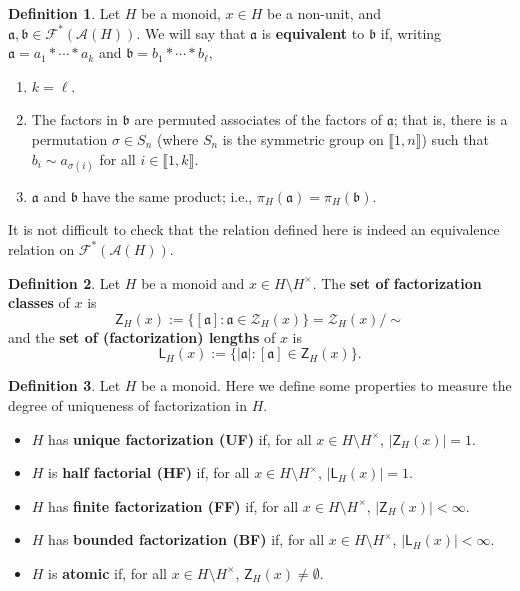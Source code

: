 \documentclass{report}
\newcommand{\A}{\mathscr{A}}
\renewcommand{\aa}{\mathfrak{a}}
\newcommand{\bb}{\mathfrak{b}}
\newcommand{\F}{\mathscr{F}}
\newcommand{\Z}{\mathcal{Z}}
\newcommand{\llb}{\llbracket}
\newcommand{\rrb}{\rrbracket}
\renewcommand{\:}{\text{:}}
\theoremstyle{definition}
\newtheorem{defn}{Definition}[section]
\begin{document}
\begin{defn}
Let $H$ be a monoid, $x\in H$ be a non-unit, and $\aa,\bb \in \F^*(\A(H))$.
We will say that $\aa$ is \textbf{equivalent} to $\bb$ if, writing $\aa = a_1*\cdots * a_k$ and $\bb = b_1*\cdots * b_\ell$,
\begin{enumerate}
\item $k = \ell$.
\item The factors in $\bb$ are permuted associates of the factors of $\aa$; that is, there is a permutation $\sigma\in S_n$ (where $S_n$ is the symmetric group on $\llb 1,n \rrb$) such that $b_i \sim a_{\sigma(i)}$ for all $i\in \llb 1,k \rrb$.
\item $\aa$ and $\bb$ have the same product; i.e., $\pi_H(\aa) = \pi_H(\bb)$.
\end{enumerate}
\end{defn}

It is not difficult to check that the relation defined here is indeed an equivalence relation on $\F^*(\A(H))$.

\begin{defn}
Let $H$ be a monoid and $x\in H\setminus H^\times$.
The \textbf{set of factorization classes} of $x$ is
\[ \mathsf{Z}_H(x) := \{ [\aa]: \aa\in \Z_H(x) \} = \Z_H(x)/\sim \]
and the \textbf{set of (factorization) lengths} of $x$ is
\[ \mathsf{L}_H(x) := \{ |\aa| : [\aa] \in \mathsf{Z}_H(x) \}. \]
\end{defn}

\begin{defn}
Let $H$ be a monoid.
Here we define some properties to measure the degree of uniqueness of factorization in $H$.
\begin{itemize}
\item $H$ has \textbf{unique factorization (UF)} if, for all $x\in H\setminus H^\times$, $|\mathsf{Z}_H(x)| = 1$.
\item $H$ is \textbf{half factorial (HF)} if, for all $x\in H\setminus H^\times$, $|\mathsf{L}_H(x)| = 1$.
\item $H$ has \textbf{finite factorization (FF)} if, for all $x\in H\setminus H^\times$, $|\mathsf{Z}_H(x)| <\infty$.
\item $H$ has \textbf{bounded factorization (BF)} if, for all $x\in H\setminus H^\times$, $|\mathsf{L}_H(x)| < \infty$.
\item $H$ is \textbf{atomic} if, for all $x\in H\setminus H^\times$, $\mathsf{Z}_H(x) \neq \emptyset$.
\end{itemize}
\end{defn}
\end{document}
